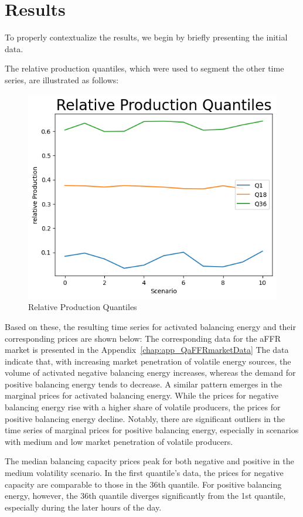 \chapter{Results}

To properly contextualize the results, we begin by briefly presenting the initial data.

The relative production quantiles, which were used to segment the other time series, are illustrated as follows:

\begin{figure}[!h]
	\centering
	\includegraphics[width=0.7\linewidth]{pictures/results/relativeProduktionQuantils.png}
	\caption{Relative Production Quantiles}
	\label{fig:Relative Production Quantiles}
\end{figure}

Based on these, the resulting time series for activated balancing energy and their corresponding prices are shown below:
The corresponding data for the aFFR market is presented in the Appendix~\ref{chap:app_QaFFRmarketData}
The data indicate that, with increasing market penetration of volatile energy sources, the volume of activated negative balancing energy increases,
whereas the demand for positive balancing energy tends to decrease.
A similar pattern emerges in the marginal prices for activated balancing energy.
While the prices for negative balancing energy rise with a higher share of volatile producers,
the prices for positive balancing energy decline.
Notably, there are significant outliers in the time series of marginal prices for positive balancing energy,
especially in scenarios with medium and low market penetration of volatile producers.

The median balancing capacity prices peak for
both negative and positive in the medium volatility scenario.
In the first quantile's data, the prices for negative capacity are comparable to those in the 36th quantile.
For positive balancing energy, however, the 36th quantile diverges significantly from the 1st quantile,
especially during the later hours of the day.

